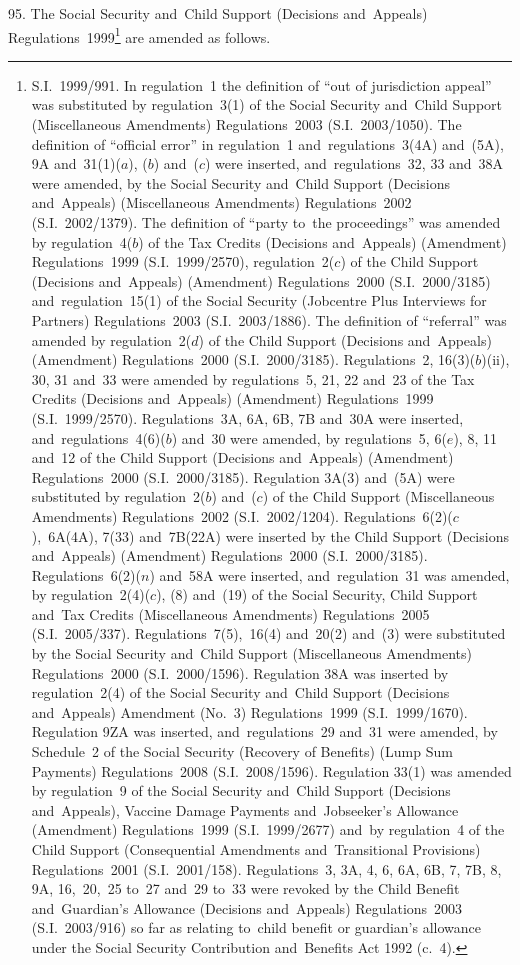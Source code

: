 \documentclass[12pt,a4paper]{article}
\begin{document}
95.  The Social Security and~Child Support (Decisions and~Appeals) Regulations~1999\footnote{S.I.~1999/991. In regulation~1 the definition of “out of jurisdiction appeal” was substituted by regulation~3(1) of the Social Security and~Child Support (Miscellaneous Amendments) Regulations~2003 (S.I.~2003/1050). The definition of “official error” in regulation~1 and~regulations~3(4A) and~(5A), 9A and~31(1)($a$), ($b$) and~($c$) were inserted, and~regulations~32, 33 and~38A were amended, by the Social Security and~Child Support (Decisions and~Appeals) (Miscellaneous Amendments) Regulations~2002 (S.I.~2002/1379). The definition of “party to~the proceedings” was amended by regulation~4($b$) of the Tax Credits (Decisions and~Appeals) (Amendment) Regulations~1999 (S.I.~1999/2570), regulation~2($c$) of the Child Support (Decisions and~Appeals) (Amendment) Regulations~2000 (S.I.~2000/3185) and~regulation~15(1) of the Social Security (Jobcentre Plus Interviews for Partners) Regulations~2003 (S.I.~2003/1886). The definition of “referral” was amended by regulation~2($d$) of the Child Support (Decisions and~Appeals) (Amendment) Regulations~2000 (S.I.~2000/3185). Regulations~2, 16(3)($b$)(ii), 30, 31 and~33 were amended by regulations~5, 21, 22 and~23 of the Tax Credits (Decisions and~Appeals) (Amendment) Regulations~1999 (S.I.~1999/2570). Regulations~3A, 6A, 6B, 7B and~30A were inserted, and~regulations~4(6)($b$) and~30 were amended, by regulations~5, 6($e$), 8, 11 and~12 of the Child Support (Decisions and~Appeals) (Amendment) Regulations~2000 (S.I.~2000/3185). Regulation 3A(3) and~(5A) were substituted by regulation~2($b$) and~($c$) of the Child Support (Miscellaneous Amendments) Regulations~2002 (S.I.~2002/1204). Regulations~6(2)($c$),~6A(4A), 7(33) and~7B(22A) were inserted by the Child Support (Decisions and~Appeals) (Amendment) Regulations~2000 (S.I.~2000/3185). Regulations~6(2)($n$) and~58A were inserted, and~regulation~31 was amended, by regulation~2(4)($c$), (8) and~(19) of the Social Security, Child Support and~Tax Credits (Miscellaneous Amendments) Regulations~2005 (S.I.~2005/337). Regulations~7(5),~16(4) and~20(2) and~(3) were substituted by the Social Security and~Child Support (Miscellaneous Amendments) Regulations~2000 (S.I.~2000/1596). Regulation 38A was inserted by regulation~2(4) of the Social Security and~Child Support (Decisions and~Appeals) Amendment (No.~3) Regulations~1999 (S.I.~1999/1670). Regulation 9ZA was inserted, and~regulations~29 and~31 were amended, by Schedule~2 of the Social Security (Recovery of Benefits) (Lump Sum Payments) Regulations~2008 (S.I.~2008/1596). Regulation 33(1) was amended by regulation~9 of the Social Security and~Child Support (Decisions and~Appeals), Vaccine Damage Payments and~Jobseeker’s Allowance (Amendment) Regulations~1999 (S.I.~1999/2677) and~by regulation~4 of the Child Support (Consequential Amendments and~Transitional Provisions) Regulations~2001 (S.I.~2001/158). Regulations~3, 3A, 4, 6, 6A, 6B, 7, 7B, 8, 9A, 16,~20,~25 to~27 and~29 to~33 were revoked by the Child Benefit and~Guardian’s Allowance (Decisions and~Appeals) Regulations~2003 (S.I.~2003/916) so far as relating to~child benefit or guardian’s allowance under the Social Security Contribution and~Benefits Act 1992 (c.~4).} are amended as follows.
\end{document}
